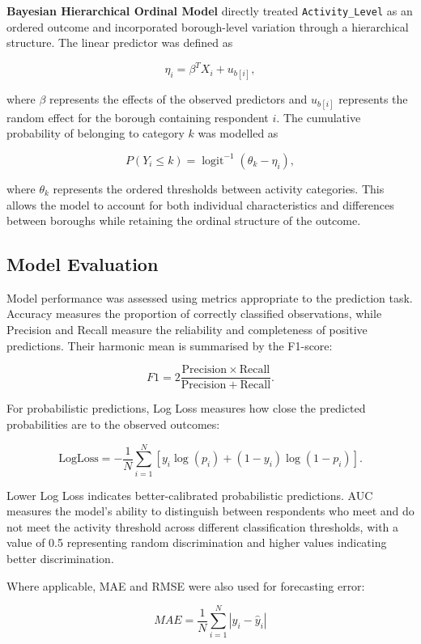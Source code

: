 \documentclass[ %
                    author={Ashrey Ashrey, Sanya Kapoor, Trisha Sharma, Yash Bhooshan Pandloskar},
                supervisor={Dr. Dalila O’Grady},
                    degree={MSc},
                     title={Using machine learning to forecast physical activity participation, volunteering and activity patterns in London},
                  subtitle={},
                      type={},
                      year={2021}]{dissertation}
\begin{document}
\textbf{Bayesian Hierarchical Ordinal Model} directly treated \texttt{Activity\_Level} as an ordered outcome and incorporated borough-level variation through a hierarchical structure. The linear predictor was defined as

\[
\eta_i = \beta^{T}X_i + u_{b[i]},
\]

where \(\beta\) represents the effects of the observed predictors and \(u_{b[i]}\) represents the random effect for the borough containing respondent \(i\). The cumulative probability of belonging to category \(k\) was modelled as

\[
P(Y_i \leq k) = \operatorname{logit}^{-1}(\theta_k-\eta_i),
\]

where \(\theta_k\) represents the ordered thresholds between activity categories. This allows the model to account for both individual characteristics and differences between boroughs while retaining the ordinal structure of the outcome.

\FloatBarrier
\subsection{Model Evaluation}

\noindent
Model performance was assessed using metrics appropriate to the prediction task. Accuracy measures the proportion of correctly classified observations, while Precision and Recall measure the reliability and completeness of positive predictions. Their harmonic mean is summarised by the F1-score:

\[
F1 = 2\frac{\mathrm{Precision}\times\mathrm{Recall}}
{\mathrm{Precision}+\mathrm{Recall}}.
\]

For probabilistic predictions, Log Loss measures how close the predicted probabilities are to the observed outcomes:

\[
\mathrm{LogLoss}
=
-\frac{1}{N}
\sum_{i=1}^{N}
\left[
y_i\log(p_i)
+
(1-y_i)\log(1-p_i)
\right].
\]

Lower Log Loss indicates better-calibrated probabilistic predictions. AUC measures the model's ability to distinguish between respondents who meet and do not meet the activity threshold across different classification thresholds, with a value of 0.5 representing random discrimination and higher values indicating better discrimination.

Where applicable, MAE and RMSE were also used for forecasting error:

\[
MAE =
\frac{1}{N}
\sum_{i=1}^{N}
\left|y_i-\widehat{y}_i\right|
\]
\end{document}
